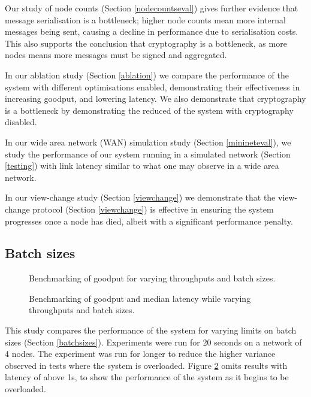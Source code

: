 Our study of node counts (Section \ref{nodecountseval}) gives further evidence that message serialisation is a bottleneck; higher node counts mean more internal messages being sent, causing a decline in performance due to serialisation costs. This also supports the conclusion that cryptography is a bottleneck, as more nodes means more messages must be signed and aggregated.

In our ablation study (Section \ref{ablation}) we compare the performance of the system with different optimisations enabled, demonstrating their effectiveness in increasing goodput, and lowering latency. We also demonstrate that cryptography is a bottleneck by demonstrating the reduced of the system with cryptography disabled.

In our wide area network (WAN) simulation study (Section \ref{minineteval}), we study the performance of our system running in a simulated network (Section \ref{testing}) with link latency similar to what one may observe in a wide area network.

In our view-change study (Section \ref{viewchange}) we demonstrate that the view-change protocol (Section \ref{viewchange}) is effective in ensuring the system progresses once a node has died, albeit with a significant performance penalty.

\subsection{Batch sizes} \label{batchsizeseval}

\begin{figure}[h!]
\centering
\resizebox{.6\textwidth}{!}{}
\caption{Benchmarking of goodput for varying throughputs and batch sizes.}
\label{throughputgoodputbatch}
\end{figure}

\begin{figure}[h!]
\centering
\resizebox{.6\textwidth}{!}{}
\caption{Benchmarking of goodput and median latency while varying throughputs and batch sizes.}
\label{goodputlatencybatch}
\end{figure}

This study compares the performance of the system for varying limits on batch sizes (Section \ref{batchsizes}). Experiments were run for 20 seconds on a network of 4 nodes. The experiment was run for longer to reduce the higher variance observed in tests where the system is overloaded. Figure \ref{goodputlatencybatch} omits results with latency of above 1s, to show the performance of the system as it begins to be overloaded.

